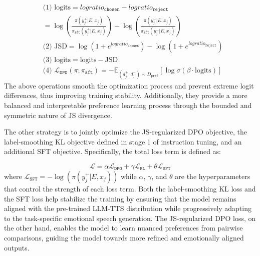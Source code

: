 \documentclass[conference]{IEEEtran}
\begin{document}
\begin{equation*}
\begin{aligned}
&\text{(1) logits} = logratio_{\texttt{chosen}} - logratio_{\texttt{reject}} \\
                  &= \log \left( \frac{\pi(y^{+}_j | E, x_j)}{\pi_{\texttt{sft}}(y^{+}_j | E, x_j)} \right) 
                     - \log \left( \frac{\pi(y^{-}_j | E, x_j)}{\pi_{\texttt{sft}}(y^{-}_j | E, x_j)} \right) \\
&\text{(2) JSD}   = \log \left( 1 + e^{logratio_{\texttt{chosen}}} \right)
                     - \log \left( 1 + e^{logratio_{\texttt{reject}}} \right) \\
& \text{(3) logits} = \text{logits} - \text{JSD} \\
& \text{(4) } \mathcal{L}_{\texttt{DPO}}(\pi; \pi_{\texttt{sft}}) = - \mathbb{E}_{(d_j^+, d_j^-) \sim D_{\texttt{pref}}} \left[ \log \sigma \left( \beta \cdot \text{logits} \right) \right]
\end{aligned}
\end{equation*}
The above operations smooth the optimization process and prevent extreme logit differences, thus improving training stability. Additionally, they provide a more balanced and interpretable preference learning process through the bounded and symmetric nature of JS divergence. 

The other strategy is to jointly optimize the JS-regularized DPO objective, the label-smoothing KL objective defined in stage 1 of instruction tuning, and an additional SFT objective. Specifically, the total loss term is defined as:

\begin{equation*}
\mathcal{L} = \alpha \mathcal{L}_{\texttt{DPO}} + \gamma \mathcal{L}_{\texttt{KL}} + \theta \mathcal{L}_{\texttt{SFT}}
\end{equation*}
where $\mathcal{L}_{\texttt{SFT}} = -\log(\pi(y^{+}_j | E, x_j))$ while $\alpha$, $\gamma$, and $\theta$ are the hyperparameters that control the strength of each loss term. Both the label-smoothing KL loss and the SFT loss help stabilize the training by ensuring that the model remains aligned with the pre-trained LLM-TTS distribution while progressively adapting to the task-specific emotional speech generation. The JS-regularized DPO loss, on the other hand, enables the model to learn nuanced preferences from pairwise comparisons, guiding the model towards more refined and emotionally aligned outputs.
\end{document}
